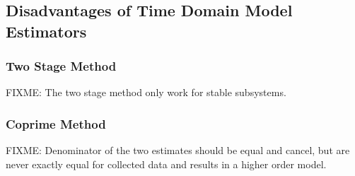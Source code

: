\documentclass[11pt,a4paper]{article}
\begin{document}
\subsection{Disadvantages of Time Domain Model Estimators}
\subsubsection{Two Stage Method}
FIXME: The two stage method only work for stable subsystems.

\subsubsection{Coprime Method}
FIXME: Denominator of the two estimates should be equal and cancel, but are
never exactly equal for collected data and results in a higher order model.
\end{document}
